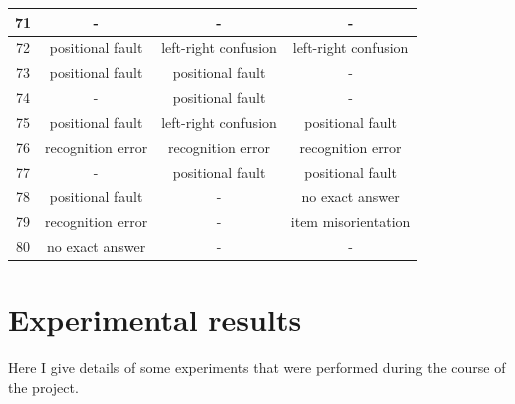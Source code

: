 \documentclass[twocolumn,11pt]{report}
\begin{document}
\begin{table}[ht]
{\begin{tabular}{|c|c|c|c|}
    71              & -                                 & -                    & -                                 \\ \hline
    72              & positional fault                  & left-right confusion & left-right confusion              \\ \hline
    73              & positional fault                  & positional fault    & -                                 \\ \hline
    74              & -                                 & positional fault    & -                                 \\ \hline
    75              & positional fault                  & left-right confusion & positional fault                 \\ \hline
    76              & recognition error                 & recognition error    & recognition error                 \\ \hline
    77              & -                                 & positional fault    & positional fault                 \\ \hline
    78              & positional fault                  & -                    & no exact answer                   \\ \hline
    79              & recognition error                 & -                    & item misorientation               \\ \hline
    80              & no exact answer                   & -                    & -                                 \\ \hline
    \end{tabular}%
    }
\end{table}
\twocolumn
\chapter{Experimental results}\label{app:Experimental_results}

Here I give details of some experiments that were performed during the
course of the project.  


\label{Easy}


\label{Hard}
\end{document}
